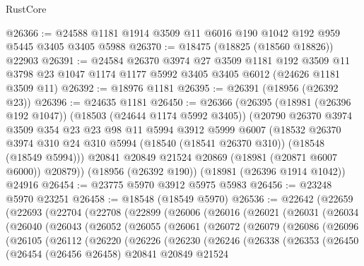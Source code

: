 \begin{lexlean}{RustCore}
\begin{coremodule}
@26366 := @24588 @1181 @1914 @3509 @11 @6016 @190 @1042 @192 @959 @5445 @3405 @3405 @5988
@26370 := @18475 (@18825 (@18560 @18826)) @22903
@26391 := @24584
    @26370
    @3974
    @27
    @3509
    @1181
    @192
    @3509
    @11
    @3798
    @23
    @1047
    @1174
    @1177
    @5992
    @3405
    @3405
    @6012
    (@24626 @1181 @3509 @11)
@26392 := @18976 @1181
@26395 := @26391 (@18956 (@26392 @23))
@26396 := @24635 @1181
@26450 := @26366
    (@26395
      (@18981 (@26396 @192 @1047))
      (@18503 (@24644 @1174 @5992 @3405))
      (@20790
        @26370
        @3974
        @3509
        @354
        @23
        @23
        @98
        @11
        @5994
        @3912
        @5999
        @6007
        (@18532
          @26370
          @3974
          @310
          @24
          @310
          @5994
          (@18540 (@18541 @26370 @310))
          (@18548 (@18549 @5994)))
        @20841
        @20849
        @21524
        @20869
        (@18981 (@20871 @6007 @6000))
        @20879))
    (@18956 (@26392 @190))
    (@18981 (@26396 @1914 @1042))
    @24916
@26454 := @23775 @5970 @3912 @5975 @5983
@26456 := @23248 @5970 @23251
@26458 := @18548 (@18549 @5970)
@26536 := @22642
    (@22659
      (@22693
        (@22704
          (@22708
            (@22899
              (@26006
                (@26016
                  (@26021
                    (@26031
                      (@26034
                        (@26040
                          (@26043
                            (@26052
                              (@26055
                                (@26061
                                  (@26072
                                    (@26079
                                      (@26086
                                        (@26096
                                          (@26105
                                            (@26112
                                              (@26220
                                                (@26226
                                                  (@26230
                                                    (@26246
                                                      (@26338
                                                        (@26353
                                                          (@26450
                                                            (@26454
                                                              (@26456 @26458)
                                                              @20841
                                                              @20849
                                                              @21524

\end{coremodule}
\end{lexlean}
